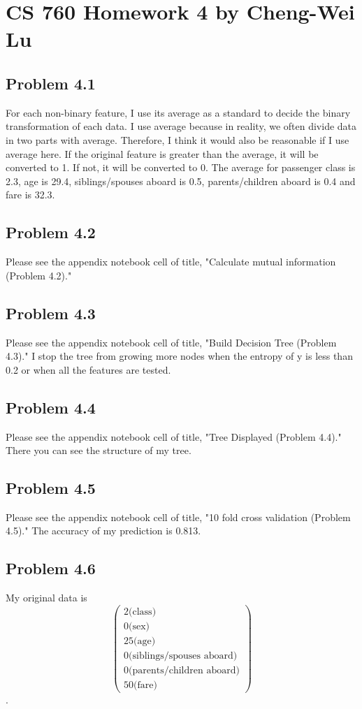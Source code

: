 \documentclass{article}
\begin{document}
\section*{CS 760 Homework 4 by Cheng-Wei Lu}

\subsection*{Problem 4.1}
	For each non-binary feature, I use its average as a standard to decide the binary transformation of each data. I use average because in reality, we often divide data in two parts with average. Therefore, I think it would also be reasonable if I use average here. If the original feature is greater than the average, it will be converted to 1. If not, it will be converted to 0. The average for passenger class is 2.3, age is 29.4, siblings/spouses aboard is 0.5, parents/children aboard is 0.4 and fare is 32.3.
\subsection*{Problem 4.2}
	Please see the appendix notebook cell of title, "Calculate mutual information (Problem 4.2)."

\subsection*{Problem 4.3}
	Please see the appendix notebook cell of title, "Build Decision Tree (Problem 4.3)."
	I stop the tree from growing more nodes when the entropy of y is less than 0.2 or when all the  features are tested.
	
\subsection*{Problem 4.4}
	Please see the appendix notebook cell of title, "Tree Displayed (Problem 4.4)." There you can see the structure of my tree.
	
\subsection*{Problem 4.5}
	Please see the appendix notebook cell of title, "10 fold cross validation (Problem 4.5)." The accuracy of my prediction is 0.813.
	
\subsection*{Problem 4.6}
	My original data is 
	\begin{equation*}
	\begin{pmatrix} 2 \text{(class)}\\ 0 \text{(sex)}\\ 25\text{(age)}\\ 0\text{(siblings/spouses aboard)}\\0\text{(parents/children aboard)}\\ 50\text{(fare)}\end{pmatrix} 
	\end{equation*}.
	
\end{document}
